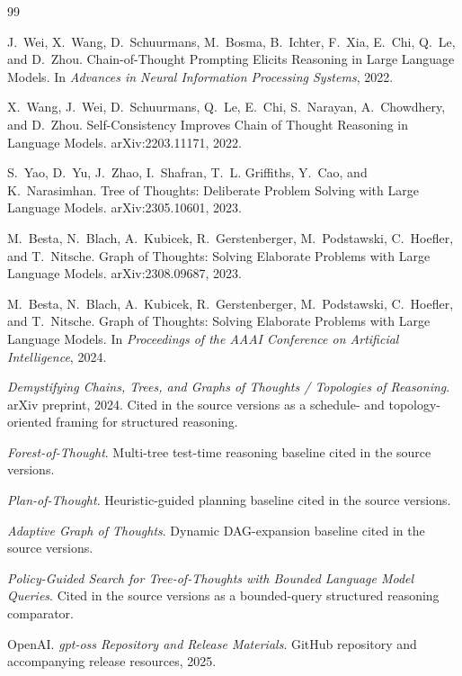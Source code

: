 \documentclass[11pt,a4paper]{article}
\numberwithin{equation}{section}
\theoremstyle{definition}
\begin{document}
\begin{thebibliography}{99}

J.~Wei, X.~Wang, D.~Schuurmans, M.~Bosma, B.~Ichter, F.~Xia, E.~Chi, Q.~Le, and D.~Zhou.
\newblock Chain-of-Thought Prompting Elicits Reasoning in Large Language Models.
\newblock In \emph{Advances in Neural Information Processing Systems}, 2022.

X.~Wang, J.~Wei, D.~Schuurmans, Q.~Le, E.~Chi, S.~Narayan, A.~Chowdhery, and D.~Zhou.
\newblock Self-Consistency Improves Chain of Thought Reasoning in Language Models.
\newblock arXiv:2203.11171, 2022.

S.~Yao, D.~Yu, J.~Zhao, I.~Shafran, T.~L. Griffiths, Y.~Cao, and K.~Narasimhan.
\newblock Tree of Thoughts: Deliberate Problem Solving with Large Language Models.
\newblock arXiv:2305.10601, 2023.

M.~Besta, N.~Blach, A.~Kubicek, R.~Gerstenberger, M.~Podstawski, C.~Hoefler, and T.~Nitsche.
\newblock Graph of Thoughts: Solving Elaborate Problems with Large Language Models.
\newblock arXiv:2308.09687, 2023.

M.~Besta, N.~Blach, A.~Kubicek, R.~Gerstenberger, M.~Podstawski, C.~Hoefler, and T.~Nitsche.
\newblock Graph of Thoughts: Solving Elaborate Problems with Large Language Models.
\newblock In \emph{Proceedings of the AAAI Conference on Artificial Intelligence}, 2024.

\emph{Demystifying Chains, Trees, and Graphs of Thoughts / Topologies of Reasoning}.
\newblock arXiv preprint, 2024.
\newblock Cited in the source versions as a schedule- and topology-oriented framing for structured reasoning.

\emph{Forest-of-Thought}.
\newblock Multi-tree test-time reasoning baseline cited in the source versions.

\emph{Plan-of-Thought}.
\newblock Heuristic-guided planning baseline cited in the source versions.

\emph{Adaptive Graph of Thoughts}.
\newblock Dynamic DAG-expansion baseline cited in the source versions.

\emph{Policy-Guided Search for Tree-of-Thoughts with Bounded Language Model Queries}.
\newblock Cited in the source versions as a bounded-query structured reasoning comparator.

OpenAI.
\newblock \emph{gpt-oss Repository and Release Materials}.
\newblock GitHub repository and accompanying release resources, 2025.


\end{thebibliography}
\end{document}
